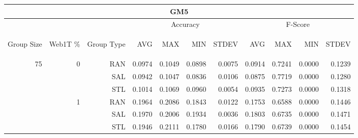 \begin{center}
\begin{table}[htbp] 
 \begin{center}
\begin{tabular}{ | r | r | r | r | r | r | r | r | r | r | r |}
\hline
\multicolumn{11}{|c|}{GM5}\\
\hline
 & & & \multicolumn{4}{|c|}{Accuracy} & \multicolumn{4}{|c|}{F-Score}\\ \cline{4-11}
\begin{sideways}Group Size\end{sideways} & \begin{sideways}Web1T \%\end{sideways} & \begin{sideways}Group Type\end{sideways} & \begin{sideways}AVG\end{sideways} & \begin{sideways}MAX\end{sideways} & \begin{sideways}MIN\end{sideways} & \begin{sideways}STDEV\end{sideways} & \begin{sideways}AVG\end{sideways} & \begin{sideways}MAX\end{sideways} & \begin{sideways}MIN\end{sideways} & \begin{sideways}STDEV\end{sideways}\\
\hline
\multirow{18}{*}{75}
 & \multirow{3}{*}{0} & RAN & 0.0974 & 0.1049 & 0.0898 & 0.0075 & 0.0914 & 0.7241 & 0.0000 & 0.1239\\ \cline{3-11}
 &   & SAL & 0.0942 & 0.1047 & 0.0836 & 0.0106 & 0.0875 & 0.7719 & 0.0000 & 0.1280\\ \cline{3-11}
 &   & STL & 0.1014 & 0.1069 & 0.0960 & 0.0054 & 0.0935 & 0.7273 & 0.0000 & 0.1318\\ \cline{2-11}
 & \multirow{3}{*}{1} & RAN & 0.1964 & 0.2086 & 0.1843 & 0.0122 & 0.1753 & 0.6588 & 0.0000 & 0.1446\\ \cline{3-11}
 &   & SAL & 0.1970 & 0.2006 & 0.1934 & 0.0036 & 0.1803 & 0.6735 & 0.0000 & 0.1471\\ \cline{3-11}
 &   & STL & 0.1946 & 0.2111 & 0.1780 & 0.0166 & 0.1790 & 0.6739 & 0.0000 & 0.1454\\ \cline{2-11}

\end{tabular}
\end{center}
\end{table}
\end{center}
